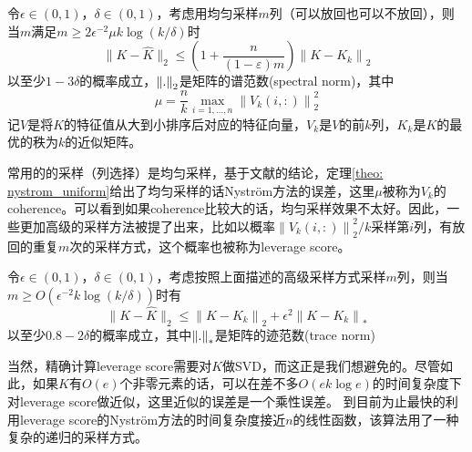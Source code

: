 \begin{theorem}
    \label{theo: nystrom_uniform}
    令$\epsilon \in (0,1)$，$\delta \in (0,1)$，考虑用均匀采样$m$列（可以放回也可以不放回），则当$m$满足$m \geq 2 \epsilon^{-2} \mu k \log (k / \delta)$时
    \begin{equation*}
        \|K-\hat{K}\|_{2} \leq\left(1+\frac{n}{(1-\varepsilon) m}\right)\left\|K-K_{k}\right\|_{2}
    \end{equation*}
    以至少$1-3\delta$的概率成立，$\left\lVert.\right\rVert_2$是矩阵的谱范数(spectral norm)，其中
    \begin{equation*}
        \mu=\frac{n}{k} \max _{i=1, \ldots, n}\left\|V_{k}(i,:)\right\|_{2}^{2}
    \end{equation*}
    记$V$是将$K$的特征值从大到小排序后对应的特征向量，$V_{k}$是$V$的前$k$列，$K_k$是$K$的最优的秩为$k$的近似矩阵。
\end{theorem}
常用的的采样（列选择）是均匀采样，基于文献\cite{gittens2016revisiting}的结论，定理\ref{theo: nystrom_uniform}给出了均匀采样的话Nyström方法的误差，这里$\mu$被称为$V_k$的coherence。可以看到如果coherence比较大的话，均匀采样效果不太好。因此，一些更加高级的采样方法被提了出来，比如以概率$\left\|V_{k}(i,:)\right\|_{2}^{2}/k$采样第$i$列，有放回的重复$m$次的采样方式，这个概率也被称为leverage score。
\begin{theorem}
    令$\epsilon \in (0,1)$，$\delta \in (0,1)$，考虑按照上面描述的高级采样方式采样$m$列，则当$m \geq O\left(\epsilon^{-2} k \log (k / \delta)\right)$时有
    \begin{equation*}
        \|K-\hat{K}\|_{2} \leq\left\|K-K_{k}\right\|_{2}+\epsilon^{2}\left\|K-K_{k}\right\|_{*}
    \end{equation*}
    以至少$0.8-2\delta$的概率成立，其中$\left\lVert.\right\rVert_{*}$是矩阵的迹范数(trace norm)
\end{theorem}
当然，精确计算leverage score需要对$K$做SVD，而这正是我们想避免的。尽管如此，如果$K$有$O(e)$个非零元素的话，可以在差不多$O(ek \log e)$的时间复杂度下对leverage score做近似，这里近似的误差是一个乘性误差。
到目前为止最快的利用leverage score的Nyström方法的时间复杂度接近$n$的线性函数，该算法用了一种复杂的递归的采样方式。

